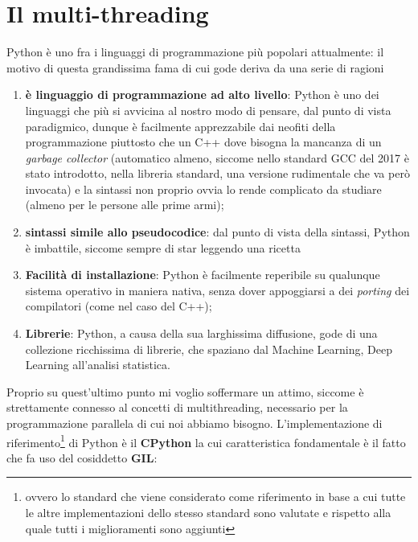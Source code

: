 \documentclass{report}
\begin{document}
	\section{Il multi-threading}
	Python è uno fra i linguaggi di programmazione più popolari attualmente: il motivo di questa grandissima fama di cui gode deriva da una serie di ragioni
	\begin{enumerate}[label=\protect\circled{\arabic*}]
		\item \textbf{è linguaggio di programmazione ad alto livello}: Python è uno dei linguaggi che più si avvicina al nostro modo di pensare, dal punto di vista paradigmico, dunque è facilmente apprezzabile dai neofiti della programmazione piuttosto che un C++ dove bisogna la mancanza di un \emph{garbage collector} (automatico almeno, siccome nello standard GCC del 2017 è stato introdotto, nella libreria standard, una versione rudimentale che va però invocata) e la sintassi non proprio ovvia lo rende complicato da studiare (almeno per le persone alle prime armi);
		\item \textbf{sintassi simile allo pseudocodice}: dal punto di vista della sintassi, Python è imbattile, siccome sempre di star leggendo una ricetta
		\item \textbf{Facilità di installazione}: Python è facilmente reperibile su qualunque sistema operativo in maniera nativa, senza dover appoggiarsi a dei \emph{porting} dei compilatori (come nel caso del C++);
		\item \textbf{Librerie}: Python, a causa della sua larghissima diffusione, gode di una collezione ricchissima di librerie, che spaziano dal Machine Learning, Deep Learning all'analisi statistica.
	\end{enumerate}
	Proprio su quest'ultimo punto mi voglio soffermare un attimo, siccome è strettamente connesso al concetti di multithreading, necessario per la programmazione parallela di cui noi abbiamo bisogno. L'implementazione di riferimento\footnote{ovvero lo standard che viene considerato come riferimento in base a cui tutte le altre implementazioni dello stesso standard sono valutate e rispetto alla quale tutti i miglioramenti sono aggiunti} di Python è il \textbf{CPython} la cui caratteristica fondamentale è il fatto che fa uso del cosiddetto \textbf{GIL}:
\end{document}
